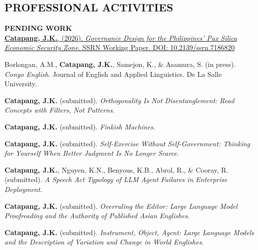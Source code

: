 \documentclass[margin]{res}
\begin{document}
\begin{resume}
\section{PROFESSIONAL ACTIVITIES}
\textbf{PENDING WORK}\\
 \href{https://doi.org/10.2139/ssrn.7186820}{\textbf{Catapang, J.K.}, (2026). \textit{Governance Design for the Philippines' Pax Silica Economic Security Zone}. SSRN Working Paper. DOI: 10.2139/ssrn.7186820}

\vspace{-12pt}

 Borlongan, A.M., \textbf{Catapang, J.K.}, Samejon, K., \& Asamura, S. (in press). \textit{Conyo English}. Journal of English and Applied Linguistics. De La Salle University.

\vspace{-12pt}

 \textbf{Catapang, J.K.} (submitted). \textit{Orthogonality Is Not Disentanglement: Read Concepts with Filters, Not Patterns}.

\vspace{-12pt}

 \textbf{Catapang, J.K.} (submitted). \textit{Finkish Machines}.

\vspace{-12pt}

 \textbf{Catapang, J.K.} (submitted). \textit{Self-Exercise Without Self-Government: Thinking for Yourself When Better Judgment Is No Longer Scarce}.

\vspace{-12pt}

 \textbf{Catapang, J.K.}, Nguyen, K.N., Benyous, K.B., Abrol, R., \& Cooray, R. (submitted). \textit{A Speech Act Typology of LLM Agent Failures in Enterprise Deployment}.

\vspace{-12pt}

 \textbf{Catapang, J.K.} (submitted). \textit{Overruling the Editor: Large Language Model Proofreading and the Authority of Published Asian Englishes}.

\vspace{-12pt}

 \textbf{Catapang, J.K.} (submitted). \textit{Instrument, Object, Agent: Large Language Models and the Description of Variation and Change in World Englishes}.


\end{resume}
\end{document}
